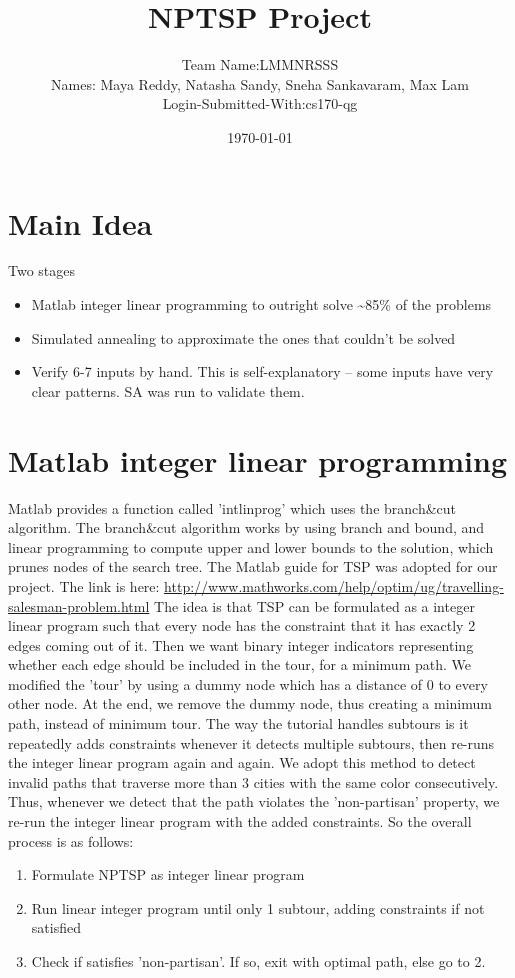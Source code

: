 \documentclass[11pt]{article}
\author{Team Name:LMMNRSSS \\ Names: Maya Reddy, Natasha Sandy, Sneha Sankavaram, Max Lam \\ Login-Submitted-With:cs170-qg}
\date{\today}
\title{NPTSP Project}
\begin{document}
\maketitle
\tableofcontents

\newpage


\section{Main Idea}
\label{sec-1}
Two stages
\begin{itemize}
\item Matlab integer linear programming to outright solve \textasciitilde{}85\% of the problems
\item Simulated annealing to approximate the ones that couldn't be solved
\item Verify 6-7 inputs by hand. This is self-explanatory -- some inputs have very clear patterns. SA was run to validate them.
\end{itemize}

\section{Matlab integer linear programming}
\label{sec-2}
Matlab provides a function called 'intlinprog' which uses the branch\&cut algorithm.
The branch\&cut algorithm works by using branch and bound, and linear programming
to compute upper and lower bounds to the solution, which prunes nodes of the search tree.
The Matlab guide for TSP was adopted for our project.
The link is here: \url{http://www.mathworks.com/help/optim/ug/travelling-salesman-problem.html}
The idea is that TSP can be formulated as a integer linear program such that every node
has the constraint that it has exactly 2 edges coming out of it. Then we want binary integer
indicators representing whether each edge should be included in the tour, for a minimum path.
We modified the 'tour' by using a dummy node which has a distance of 0 to every other node.
At the end, we remove the dummy node, thus creating a minimum path, instead of minimum tour.
The way the tutorial handles subtours is it repeatedly adds constraints whenever it detects
multiple subtours, then re-runs the integer linear program again and again. We adopt this method
to detect invalid paths that traverse more than 3 cities with the same color consecutively.
Thus, whenever we detect that the path violates the 'non-partisan' property, we re-run the integer
linear program with the added constraints. So the overall process is as follows:\\
\begin{enumerate}
\item Formulate NPTSP as integer linear program
\item Run linear integer program until only 1 subtour, adding constraints if not satisfied
\item Check if satisfies 'non-partisan'. If so, exit with optimal path, else go to 2.
\end{enumerate}
\end{document}
